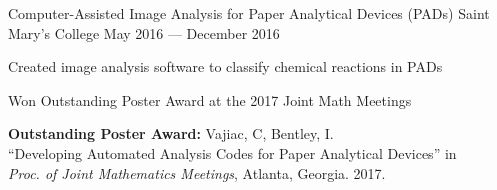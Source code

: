 \begin{cventries}
{  }
  {Computer-Assisted Image Analysis for Paper Analytical Devices (PADs)}
  {Saint Mary's College}
  {May 2016 --- December 2016}
  {\begin{cvitems}
    \item {Created image analysis software to classify chemical reactions in PADs}
    \item {Won Outstanding Poster Award at the 2017 Joint Math Meetings}
    \item \textbf{ Outstanding Poster Award:}
      Vajiac, C, Bentley, I. \\
      ``Developing Automated Analysis Codes for Paper Analytical Devices'' in \\
    \textit{Proc. of Joint Mathematics Meetings}, Atlanta, Georgia. 2017.
    \end{cvitems}
  }
\end{cventries}
